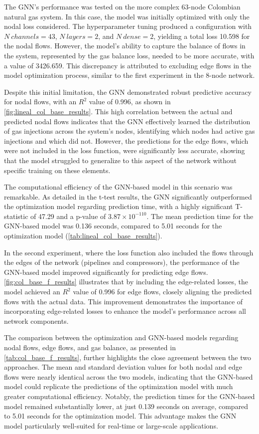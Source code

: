 The GNN's performance was tested on the more complex 63-node Colombian natural gas system. In this case, the model was initially optimized with only the nodal loss considered. The hyperparameter tuning produced a configuration with $N\ channels=43$, $N\ layers=2$, and $N\ dense=2$, yielding a total loss 10.598 for the nodal flows. However, the model's ability to capture the balance of flows in the system, represented by the gas balance loss, needed to be more accurate, with a value of 3426.659. This discrepancy is attributed to excluding edge flows in the model optimization process, similar to the first experiment in the 8-node network.


Despite this initial limitation, the GNN demonstrated robust predictive accuracy for nodal flows, with an $R^2$ value of 0.996, as shown in \cref{fig:lineal_col_base_results}. This high correlation between the actual and predicted nodal flows indicates that the GNN effectively learned the distribution of gas injections across the system's nodes, identifying which nodes had active gas injections and which did not. However, the predictions for the edge flows, which were not included in the loss function, were significantly less accurate, showing that the model struggled to generalize to this aspect of the network without specific training on these elements.

The computational efficiency of the GNN-based model in this scenario was remarkable. As detailed in the t-test results, the GNN significantly outperformed the optimization model regarding prediction time, with a highly significant T-statistic of 47.29 and a p-value of $3.87 \times 10^{-110}$. The mean prediction time for the GNN-based model was 0.136 seconds, compared to 5.01 seconds for the optimization model (\cref{tab:lineal_col_base_results}). 

In the second experiment, where the loss function also included the flows through the edges of the network (pipelines and compressors), the performance of the GNN-based model improved significantly for predicting edge flows. \cref{fig:col_base_f_results} illustrates that by including the edge-related losses, the model achieved an $R^2$ value of 0.996 for edge flows, closely aligning the predicted flows with the actual data. This improvement demonstrates the importance of incorporating edge-related losses to enhance the model's performance across all network components.

The comparison between the optimization and GNN-based models regarding nodal flows, edge flows, and gas balance, as presented in \cref{tab:col_base_f_results}, further highlights the close agreement between the two approaches. The mean and standard deviation values for both nodal and edge flows were nearly identical across the two models, indicating that the GNN-based model could replicate the predictions of the optimization model with much greater computational efficiency. Notably, the prediction times for the GNN-based model remained substantially lower, at just 0.139 seconds on average, compared to 5.01 seconds for the optimization model. This advantage makes the GNN model particularly well-suited for real-time or large-scale applications.



